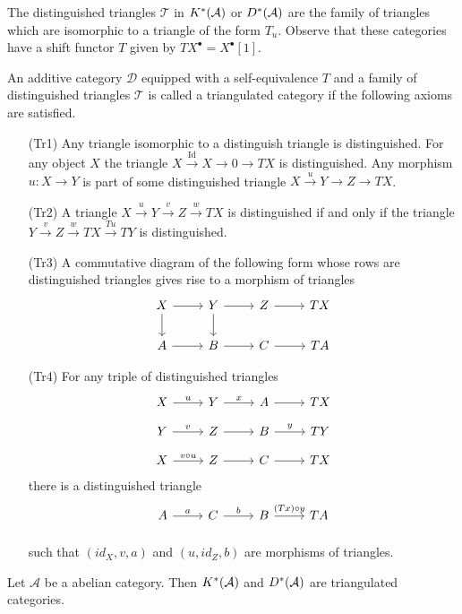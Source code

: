 The distinguished triangles $\mathcal{T}$ in $K^*(\AA)$ or $D^*(\AA)$ are the family of triangles which are isomorphic to a triangle of the form $T_u$.
Observe that these categories have a shift functor $T$ given by $TX^\bullet = X^\bullet[1]$.
\begin{definition}
 An additive category $\mathcal{D}$ equipped with a self-equivalence $T$ and a family of distinguished triangles $\mathcal{T}$ is called a triangulated category if the following axioms are satisfied.
 \begin{enumerate}
   \item[(Tr1)] Any triangle isomorphic to a distinguish triangle is distinguished. For any object $X$ the triangle $X\xrightarrow{\operatorname{Id}} X \to 0 \to TX$ is distinguished.
   Any morphism $u:X\to Y$ is part of some distinguished triangle $X\xrightarrow{u} Y \to Z \to TX$.
   \item[(Tr2)] A triangle $X\xrightarrow{u} Y \xrightarrow{v} Z \xrightarrow{w} TX$ is distinguished if and only if the triangle $Y \xrightarrow{v} Z \xrightarrow{w} TX \xrightarrow{Tu} TY$ is distinguished.
   \item[(Tr3)] A commutative diagram of the following form whose rows are distinguished triangles gives rise to a morphism of triangles
   $$
     \begin{tikzcd}
       X\arrow{d}\rar& Y\arrow{d}\rar & Z\rar & TX\\
       A\rar& B\rar & C\rar & TA
     \end{tikzcd}
    $$
   \item[(Tr4)] For any triple of distinguished triangles
   $$
     \begin{tikzcd}[row sep=small]
       X \arrow{r}{u} & Y \arrow{r}{x}& A \arrow{r}{} & TX \\
       Y \arrow{r}{v} & Z \arrow{r}{}& B \arrow{r}{y} & TY\\
       X \arrow{r}{v\circ u} & Z\arrow{r}{} & C\arrow{r}{} & TX
     \end{tikzcd}
   $$
   there is a distinguished triangle
   $$\begin{tikzcd}[row sep=small]
     A \arrow{r}{a} & C \arrow{r}{b}& B \arrow{r}{(Tx)\circ y} & TA \\
   \end{tikzcd} $$
   such that $(id_X, v,a)$ and $(u,id_Z,b)$ are morphisms of triangles.
   \end{enumerate}
\end{definition}
\begin{proposition}{\cite[Chapter 1]{dimca2004sheaves}}
 Let $\mathcal{A}$ be a abelian category. Then $K^*(\AA)$ and $D^*(\AA)$ are triangulated categories.
\end{proposition}
